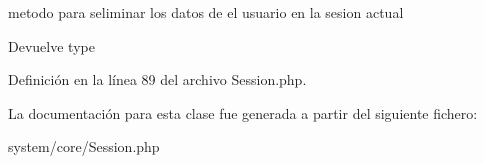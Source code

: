 metodo para seliminar los datos de el usuario en la sesion actual

\begin{DoxyReturn}{Devuelve}
type 
\end{DoxyReturn}


Definición en la línea 89 del archivo Session.\+php.



La documentación para esta clase fue generada a partir del siguiente fichero\+:\begin{DoxyCompactItemize}
\item 
system/core/Session.\+php\end{DoxyCompactItemize}
